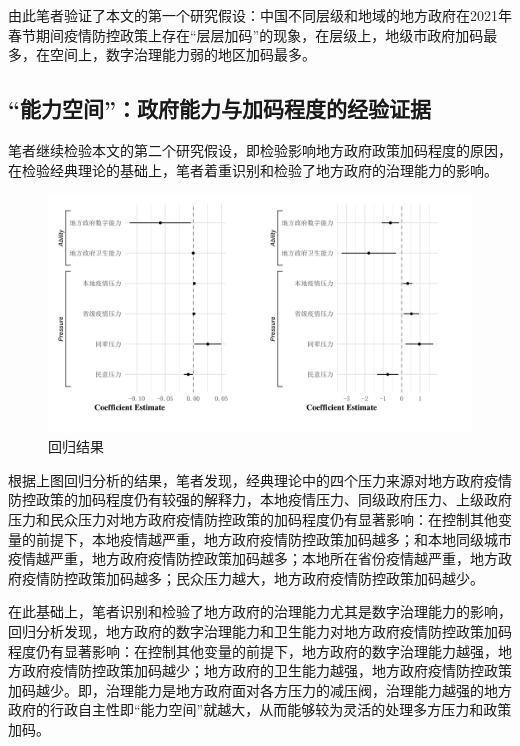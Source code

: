 \documentclass[
  12pt,
]{ctexart}
\begin{document}
由此笔者验证了本文的第一个研究假设：中国不同层级和地域的地方政府在2021年春节期间疫情防控政策上存在``层层加码''的现象，在层级上，地级市政府加码最多，在空间上，数字治理能力弱的地区加码最多。

\hypertarget{ux80fdux529bux7a7aux95f4ux653fux5e9cux80fdux529bux4e0eux52a0ux7801ux7a0bux5ea6ux7684ux7ecfux9a8cux8bc1ux636e}{%
\subsection{``能力空间''：政府能力与加码程度的经验证据}\label{ux80fdux529bux7a7aux95f4ux653fux5e9cux80fdux529bux4e0eux52a0ux7801ux7a0bux5ea6ux7684ux7ecfux9a8cux8bc1ux636e}}

笔者继续检验本文的第二个研究假设，即检验影响地方政府政策加码程度的原因，在检验经典理论的基础上，笔者着重识别和检验了地方政府的治理能力的影响。

\begin{figure}[h]
\includegraphics[width=1\linewidth]{../figures/figure1} \caption{回归结果}\label{fig:unnamed-chunk-5}
\end{figure}

根据上图回归分析的结果，笔者发现，经典理论中的四个压力来源对地方政府疫情防控政策的加码程度仍有较强的解释力，本地疫情压力、同级政府压力、上级政府压力和民众压力对地方政府疫情防控政策的加码程度仍有显著影响：在控制其他变量的前提下，本地疫情越严重，地方政府疫情防控政策加码越多；和本地同级城市疫情越严重，地方政府疫情防控政策加码越多；本地所在省份疫情越严重，地方政府疫情防控政策加码越多；民众压力越大，地方政府疫情防控政策加码越少。

在此基础上，笔者识别和检验了地方政府的治理能力尤其是数字治理能力的影响，回归分析发现，地方政府的数字治理能力和卫生能力对地方政府疫情防控政策加码程度仍有显著影响：在控制其他变量的前提下，地方政府的数字治理能力越强，地方政府疫情防控政策加码越少；地方政府的卫生能力越强，地方政府疫情防控政策加码越少。即，治理能力是地方政府面对各方压力的减压阀，治理能力越强的地方政府的行政自主性即``能力空间''就越大，从而能够较为灵活的处理多方压力和政策加码。
\end{document}
